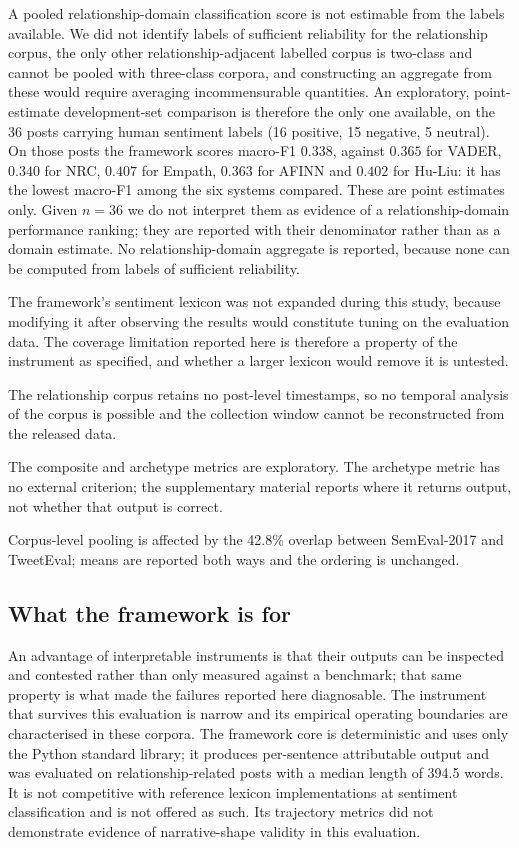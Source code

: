\documentclass[fleqn,10pt]{wlscirep}
\begin{document}
A pooled relationship-domain classification score is not estimable from the labels available. We did not identify labels of sufficient reliability for the relationship corpus, the only other relationship-adjacent labelled corpus is two-class and cannot be pooled with three-class corpora, and constructing an aggregate from these would require averaging incommensurable quantities. An exploratory, point-estimate development-set comparison is therefore the only one available, on the 36 posts carrying human sentiment labels (16 positive, 15 negative, 5 neutral). On those posts the framework scores macro-F1 $0.338$, against $0.365$ for VADER, $0.340$ for NRC, $0.407$ for Empath, $0.363$ for AFINN and $0.402$ for Hu-Liu: it has the lowest macro-F1 among the six systems compared. These are point estimates only. Given $n=36$ we do not interpret them as evidence of a relationship-domain performance ranking; they are reported with their denominator rather than as a domain estimate. No relationship-domain aggregate is reported, because none can be computed from labels of sufficient reliability.

The framework's sentiment lexicon was not expanded during this study, because modifying it after observing the results would constitute tuning on the evaluation data. The coverage limitation reported here is therefore a property of the instrument as specified, and whether a larger lexicon would remove it is untested.

The relationship corpus retains no post-level timestamps, so no temporal analysis of the corpus is possible and the collection window cannot be reconstructed from the released data.

The composite and archetype metrics are exploratory. The archetype metric has no external criterion; the supplementary material reports where it returns output, not whether that output is correct.

Corpus-level pooling is affected by the 42.8\% overlap between SemEval-2017 and TweetEval; means are reported both ways and the ordering is unchanged.

\subsection{What the framework is for}

An advantage of interpretable instruments is that their outputs can be inspected and contested rather than only measured against a benchmark\cite{doshivelez2017}; that same property is what made the failures reported here diagnosable. The instrument that survives this evaluation is narrow and its empirical operating boundaries are characterised in these corpora. The framework core is deterministic and uses only the Python standard library; it produces per-sentence attributable output and was evaluated on relationship-related posts with a median length of 394.5 words. It is not competitive with reference lexicon implementations at sentiment classification and is not offered as such. Its trajectory metrics did not demonstrate evidence of narrative-shape validity in this evaluation.
\end{document}
